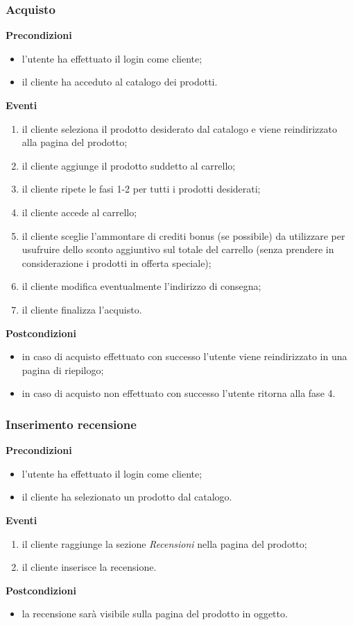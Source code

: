 \documentclass[a4paper, 14pt]{article}
\begin{document}
\begin{flushleft}
			\subsubsection{Acquisto}
			\textbf{Precondizioni}
			\begin{itemize}
				\item l'utente ha effettuato il login come cliente;
				\item il cliente ha acceduto al catalogo dei prodotti.
			\end{itemize}
			\textbf{Eventi}
			\begin{enumerate}
				\item il cliente seleziona il prodotto desiderato dal catalogo e viene reindirizzato alla pagina del prodotto;
				\item il cliente aggiunge il prodotto suddetto al carrello;
				\item il cliente ripete le fasi 1-2 per tutti i prodotti desiderati;
				\item il cliente accede al carrello;
				\item il cliente sceglie l'ammontare di crediti bonus (se possibile) da utilizzare per usufruire dello sconto aggiuntivo
				      sul totale del carrello (senza prendere in considerazione i prodotti in offerta speciale);
				\item il cliente modifica eventualmente l'indirizzo di consegna;
				\item il cliente finalizza l'acquisto.
			\end{enumerate}
			\textbf{Postcondizioni}
			\begin{itemize}
				\item in caso di acquisto effettuato con successo l'utente viene reindirizzato in una pagina di riepilogo;
				\item in caso di acquisto non effettuato con successo l'utente ritorna alla fase 4.
			\end{itemize}
		
			\bigskip
			\subsubsection{Inserimento recensione}
			\textbf{Precondizioni}
			\begin{itemize}
				\item l'utente ha effettuato il login come cliente;
				\item il cliente ha selezionato un prodotto dal catalogo.
			\end{itemize}
			\textbf{Eventi}
			\begin{enumerate}
				\item il cliente raggiunge la sezione \textit{Recensioni} nella pagina del prodotto;
				\item il cliente inserisce la recensione.
			\end{enumerate}
			\textbf{Postcondizioni}
			\begin{itemize}
				\item la recensione sarà visibile sulla pagina del prodotto in oggetto.
			\end{itemize}
			

\end{flushleft}
\end{document}
